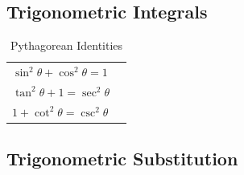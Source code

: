 \documentclass[8pt,letterpaper]{article}
\begin{document}

\subsection*{Trigonometric Integrals} %
\begin{table}
\begin{tabular}{l l}
$\sin^2 \theta + \cos^2 \theta = 1$ \\
$\tan^2 \theta + 1 = \sec^2 \theta$ \\ 
$1 + \cot^2 \theta = \csc^2 \theta$
\end{tabular}
\caption{Pythagorean Identities}
\end{table}

\subsection*{Trigonometric Substitution} %
\end{document}
